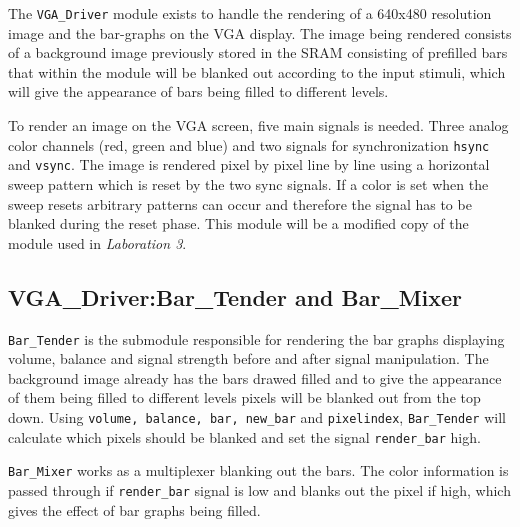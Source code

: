 The \verb+VGA_Driver+ module exists to handle the rendering of a 640x480 resolution image and the bar-graphs on the VGA display. The image being rendered consists of a background image previously stored in the SRAM consisting of prefilled bars that within the module will be blanked out according to the input stimuli, which will give the appearance of bars being filled to different levels.   

To render an image on the VGA screen, five main signals is needed. Three analog color channels (red, green and blue) and two signals for synchronization \verb=hsync= and \verb=vsync=. The image is rendered pixel by pixel line by line using a horizontal sweep pattern which is reset by the two sync signals. If a color is set when the sweep resets arbitrary patterns can occur and therefore the signal has to be blanked during the reset phase. This module will be a modified copy of the module used in \emph{Laboration 3}.


\subsection{VGA\_Driver:Bar\_Tender and Bar\_Mixer}\label{sec:Bar_Tender}
\verb+Bar_Tender+ is the submodule responsible for rendering the bar graphs displaying volume, balance and signal strength before and after signal manipulation. The background image already has the bars drawed filled and to give the appearance of them being filled to different levels pixels will be blanked out from the top down. Using \verb=volume, balance, bar, new_bar= and \verb=pixelindex=, \verb+Bar_Tender+ will calculate which pixels should be blanked and set the signal \verb=render_bar= high.

\verb+Bar_Mixer+ works as a multiplexer blanking out the bars. The color information is passed through if \verb=render_bar= signal is low and blanks out the pixel if high, which gives the effect of bar graphs being filled.


